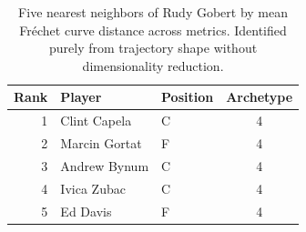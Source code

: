 \begin{table}[htbp]
  \centering\small
  \begin{tabular}{rllc}
    \toprule
    Rank & Player & Position & Archetype \\
    \midrule
    1 & Clint Capela & C & 4 \\
    2 & Marcin Gortat & F & 4 \\
    3 & Andrew Bynum & C & 4 \\
    4 & Ivica Zubac & C & 4 \\
    5 & Ed Davis & F & 4 \\
    \bottomrule
  \end{tabular}
  \caption{Five nearest neighbors of Rudy Gobert by mean Fr\'{e}chet curve distance across metrics. Identified purely from trajectory shape without dimensionality reduction.}
  \label{tab:Rudy_Gobert_frechet_curve_neighbors}
\end{table}

